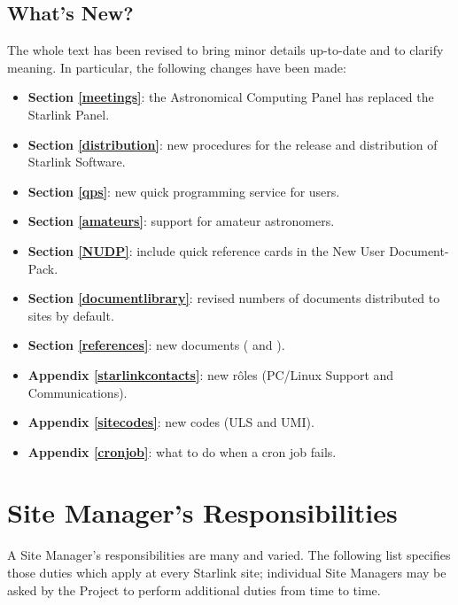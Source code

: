 \subsection{What's New?}

The whole text has been revised to bring minor details up-to-date and
to clarify meaning.
In particular, the following changes have been made:

\begin{itemize}
\item {\bf Section \ref{meetings}}:
 the Astronomical Computing Panel has replaced the Starlink Panel.
\item {\bf Section \ref{distribution}}:
 new procedures for the release and distribution of Starlink Software.
\item {\bf Section \ref{qps}}:
 new quick programming service for users.
\item {\bf Section \ref{amateurs}}:
 support for amateur astronomers.
\item {\bf Section \ref{NUDP}}:
 include quick reference cards in the New User Document-Pack.
\item {\bf Section \ref{documentlibrary}}:
 revised numbers of documents distributed to sites by default.
\item {\bf Section \ref{references}}:
 new documents ( and ).
\item {\bf Appendix \ref{starlinkcontacts}}:
 new r\^{o}les (PC/Linux Support and Communications).
\item {\bf Appendix \ref{sitecodes}}:
 new codes (ULS and UMI).
\item {\bf Appendix \ref{cronjob}}:
 what to do when a cron job fails.
\end{itemize}

\newpage

\section {\label{sitemanagersresponsibilities}Site Manager's Responsibilities}

A Site Manager's responsibilities are many and varied.
The following list specifies those duties which apply at every Starlink site;
individual Site Managers may be asked by the Project to perform additional
duties from time to time.

